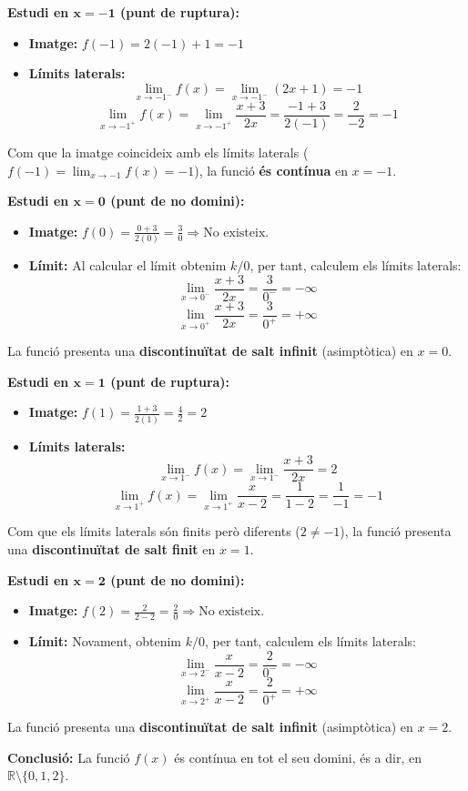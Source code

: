 \documentclass[12pt,a4paper]{article}
\begin{document}
\textbf{Estudi en $\mathbf{x = -1}$ (punt de ruptura):}
\begin{itemize}
    \item \textbf{Imatge:} $f(-1) = 2(-1) + 1 = -1$
    \item \textbf{Límits laterals:}
    \[ \lim_{x \to -1^-} f(x) = \lim_{x \to -1^-} (2x + 1) = -1 \]
    \[ \lim_{x \to -1^+} f(x) = \lim_{x \to -1^+} \frac{x + 3}{2x} = \frac{-1 + 3}{2(-1)} = \frac{2}{-2} = -1 \]
\end{itemize}
Com que la imatge coincideix amb els límits laterals ($f(-1) = \lim_{x \to -1} f(x) = -1$), la funció \textbf{és contínua} en $x = -1$.

\vspace{0.5cm}
\textbf{Estudi en $\mathbf{x = 0}$ (punt de no domini):}
\begin{itemize}
    \item \textbf{Imatge:} $f(0) = \frac{0 + 3}{2(0)} = \frac{3}{0} \Rightarrow \text{No existeix.}$
    \item \textbf{Límit:} Al calcular el límit obtenim $k/0$, per tant, calculem els límits laterals:
    \[ \lim_{x \to 0^-} \frac{x + 3}{2x} = \frac{3}{0^-} = -\infty \]
    \[ \lim_{x \to 0^+} \frac{x + 3}{2x} = \frac{3}{0^+} = +\infty \]
\end{itemize}
La funció presenta una \textbf{discontinuïtat de salt infinit} (asimptòtica) en $x = 0$.

\vspace{0.5cm}
\textbf{Estudi en $\mathbf{x = 1}$ (punt de ruptura):}
\begin{itemize}
    \item \textbf{Imatge:} $f(1) = \frac{1 + 3}{2(1)} = \frac{4}{2} = 2$
    \item \textbf{Límits laterals:}
    \[ \lim_{x \to 1^-} f(x) = \lim_{x \to 1^-} \frac{x + 3}{2x} = 2 \]
    \[ \lim_{x \to 1^+} f(x) = \lim_{x \to 1^+} \frac{x}{x - 2} = \frac{1}{1 - 2} = \frac{1}{-1} = -1 \]
\end{itemize}
Com que els límits laterals són finits però diferents ($2 \neq -1$), la funció presenta una \textbf{discontinuïtat de salt finit} en $x = 1$.

\vspace{0.5cm}
\textbf{Estudi en $\mathbf{x = 2}$ (punt de no domini):}
\begin{itemize}
    \item \textbf{Imatge:} $f(2) = \frac{2}{2 - 2} = \frac{2}{0} \Rightarrow \text{No existeix.}$
    \item \textbf{Límit:} Novament, obtenim $k/0$, per tant, calculem els límits laterals:
    \[ \lim_{x \to 2^-} \frac{x}{x - 2} = \frac{2}{0^-} = -\infty \]
    \[ \lim_{x \to 2^+} \frac{x}{x - 2} = \frac{2}{0^+} = +\infty \]
\end{itemize}
La funció presenta una \textbf{discontinuïtat de salt infinit} (asimptòtica) en $x = 2$.

\vspace{0.5cm}
\textbf{Conclusió:}
La funció $f(x)$ és contínua en tot el seu domini, és a dir, en $\mathbb{R} \setminus \{0, 1, 2\}$.
\end{document}
